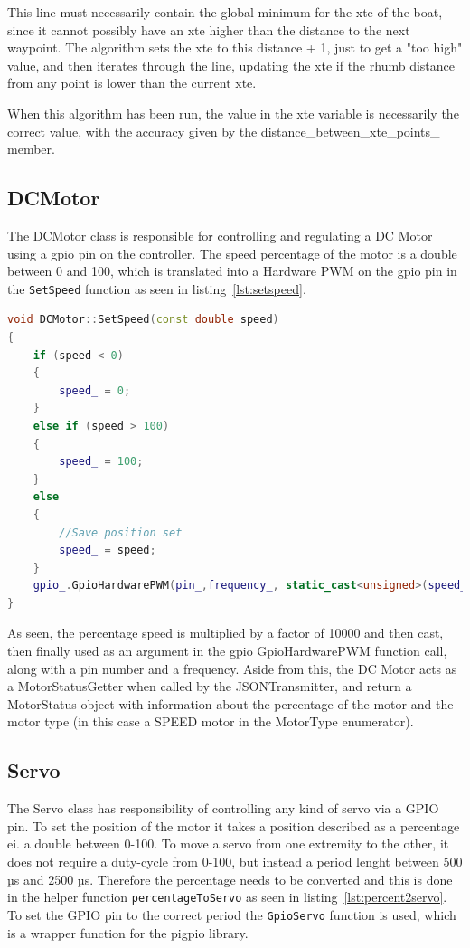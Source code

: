 This line must necessarily contain the global minimum for the xte of the boat, since it cannot possibly have an xte higher than the distance to the next waypoint. The algorithm sets the xte to this distance + 1, just to get a "too high" value, and then iterates through the line, updating the xte if the rhumb distance from any point is lower than the current xte. 

When this algorithm has been run, the value in the xte variable is necessarily the correct value, with the accuracy given by the distance_between_xte_points_ member.

\subsection{DCMotor}
The DCMotor class is responsible for controlling and regulating a DC Motor using a gpio pin on the controller. The speed percentage of the motor is a double between 0 and 100, which is translated into a Hardware PWM on the gpio pin in the \texttt{SetSpeed} function as seen in listing~\ref{lst:setspeed}. 

\begin{lstlisting}[caption = {Function responsible for DC Motor speed percentage to hardware PWM translation}, captionpos=b, label={lst:setspeed}, language=C++,firstnumber=1]
void DCMotor::SetSpeed(const double speed)
{
	if (speed < 0)
	{
		speed_ = 0;
	}
	else if (speed > 100)
	{
		speed_ = 100;
	}
	else
	{
		//Save position set
		speed_ = speed;
	}
	gpio_.GpioHardwarePWM(pin_,frequency_, static_cast<unsigned>(speed_* 10000));
}
\end{lstlisting}

As seen, the percentage speed is multiplied by a factor of 10000 and then cast, then finally used as an argument in the gpio GpioHardwarePWM function call, along with a pin number and a frequency. Aside from this, the DC Motor acts as a MotorStatusGetter when called by the JSONTransmitter, and return a MotorStatus object with information about the percentage of the motor and the motor type (in this case a SPEED motor in the MotorType enumerator).

\subsection{Servo}
The Servo class has responsibility of controlling any kind of servo via a GPIO pin. To set the position of the motor it takes a position described as a percentage ei. a double between 0-100. To move a servo from one extremity to the other, it does not require a duty-cycle from 0-100, but instead a period lenght between 500 µs and 2500 µs\cite{pigpio}. Therefore the percentage needs to be converted and this is done in the helper function \texttt{percentageToServo} as seen in listing~\ref{lst:percent2servo}. To set the GPIO pin to the correct period the \texttt{GpioServo} function is used, which is a wrapper function for the pigpio library\cite{pigpio}.

